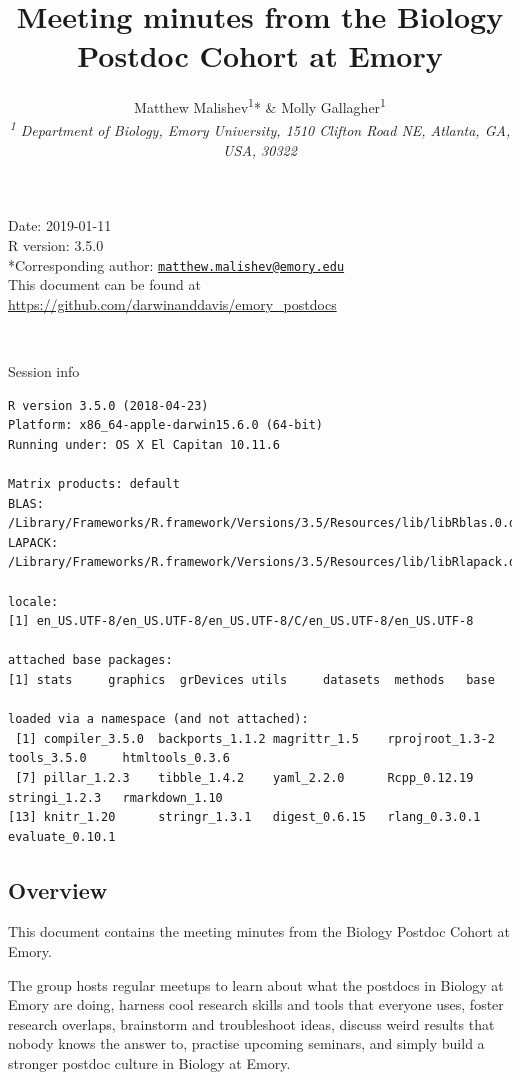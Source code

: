 \documentclass[10,portrait]{article}
\title{Meeting minutes from the Biology Postdoc Cohort at Emory}
\author{Matthew Malishev\textsuperscript{1}* \& Molly
Gallagher\textsuperscript{1}\\[2\baselineskip]\emph{\textsuperscript{1}
Department of Biology, Emory University, 1510 Clifton Road NE, Atlanta,
GA, USA, 30322}}
\date{}
\begin{document}
\maketitle

{
\hypersetup{linkcolor=black}
\setcounter{tocdepth}{2}
\tableofcontents
}
\newpage   

Date: 2019-01-11\\
R version: 3.5.0\\
*Corresponding author:
\href{mailto:matthew.malishev@emory.edu}{\nolinkurl{matthew.malishev@emory.edu}}\\
This document can be found at
\url{https://github.com/darwinanddavis/emory_postdocs}

~

Session info

\begin{verbatim}
R version 3.5.0 (2018-04-23)
Platform: x86_64-apple-darwin15.6.0 (64-bit)
Running under: OS X El Capitan 10.11.6

Matrix products: default
BLAS: /Library/Frameworks/R.framework/Versions/3.5/Resources/lib/libRblas.0.dylib
LAPACK: /Library/Frameworks/R.framework/Versions/3.5/Resources/lib/libRlapack.dylib

locale:
[1] en_US.UTF-8/en_US.UTF-8/en_US.UTF-8/C/en_US.UTF-8/en_US.UTF-8

attached base packages:
[1] stats     graphics  grDevices utils     datasets  methods   base     

loaded via a namespace (and not attached):
 [1] compiler_3.5.0  backports_1.1.2 magrittr_1.5    rprojroot_1.3-2 tools_3.5.0     htmltools_0.3.6
 [7] pillar_1.2.3    tibble_1.4.2    yaml_2.2.0      Rcpp_0.12.19    stringi_1.2.3   rmarkdown_1.10 
[13] knitr_1.20      stringr_1.3.1   digest_0.6.15   rlang_0.3.0.1   evaluate_0.10.1
\end{verbatim}

\newpage  

\subsection{Overview}\label{overview}

This document contains the meeting minutes from the Biology Postdoc
Cohort at Emory.

The group hosts regular meetups to learn about what the postdocs in
Biology at Emory are doing, harness cool research skills and tools that
everyone uses, foster research overlaps, brainstorm and troubleshoot
ideas, discuss weird results that nobody knows the answer to, practise
upcoming seminars, and simply build a stronger postdoc culture in
Biology at Emory.
\end{document}
